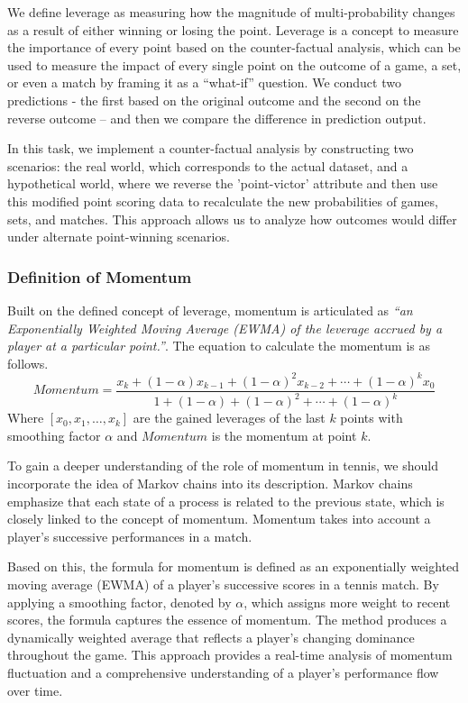 \documentclass{mcmthesis}
\begin{document}
We define leverage as measuring how the magnitude of multi-probability changes as a result of either winning or losing the point. Leverage is a concept to measure the importance of every point based on the counter-factual analysis, which can be used to measure the impact of every single point on the outcome of a game, a set, or even a match by framing it as a “what-if” question. We conduct two predictions - the first based on the original outcome and the second on the reverse outcome – and then we compare the difference in prediction output.\cite{1}

In this task, we implement a counter-factual analysis by constructing two scenarios: the real world, which corresponds to the actual dataset, and a hypothetical world, where we reverse the 'point-victor' attribute and then use this modified point scoring data to recalculate the new probabilities of games, sets, and matches. This approach allows us to analyze how outcomes would differ under alternate point-winning scenarios.

\subsubsection{Definition of Momentum}
Built on the defined concept of leverage, momentum is articulated as \textit{“an Exponentially Weighted Moving Average (EWMA) of the leverage accrued by a player at a particular point.”}. The equation to calculate the momentum is as follows.
\begin{equation} \label{eq:momentum}
Momentum = \frac{x_k + (1 - \alpha)x_{k-1} + (1 - \alpha)^2 x_{k-2} + \cdots + (1 - \alpha)^k x_0}{1 + (1 - \alpha) + (1 - \alpha)^2 + \cdots + (1 - \alpha)^k}
\end{equation}
Where $[x_0, x_1, \ldots, x_k]$ are the gained leverages of the last $k$ points with smoothing factor $\alpha$ and $Momentum$ is the momentum at point $k$.

To gain a deeper understanding of the role of momentum in tennis, we should incorporate the idea of Markov chains into its description. Markov chains emphasize that each state of a process is related to the previous state, which is closely linked to the concept of momentum. Momentum takes into account a player's successive performances in a match.

Based on this, the formula for momentum is defined as an exponentially weighted moving average (EWMA) of a player's successive scores in a tennis match. By applying a smoothing factor, denoted by $\alpha$, which assigns more weight to recent scores, the formula captures the essence of momentum. The method produces a dynamically weighted average that reflects a player's changing dominance throughout the game. This approach provides a real-time analysis of momentum fluctuation and a comprehensive understanding of a player's performance flow over time.
\end{document}
